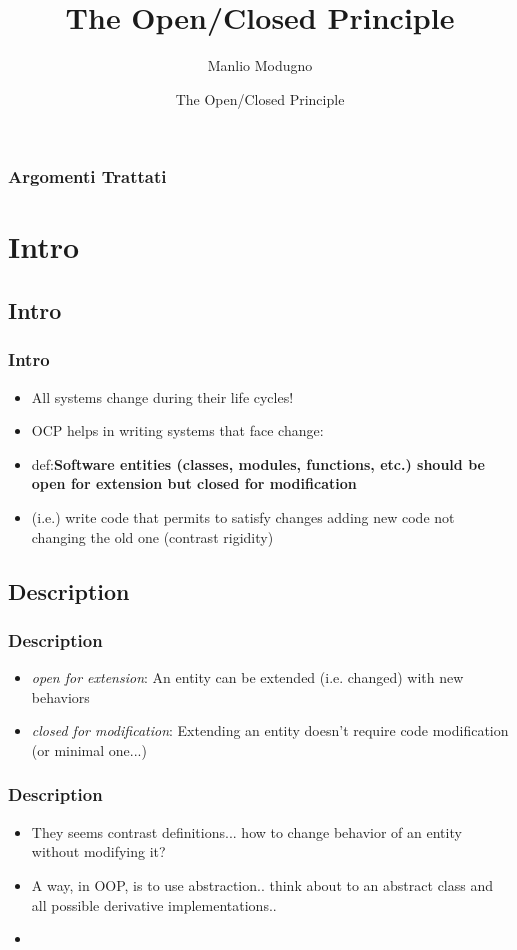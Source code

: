 \documentclass{beamer}
\title{The Open/Closed Principle}
\author{Manlio Modugno}
\institute[GMTechnologies]
\date[]{The Open/Closed Principle}
\begin{document}
\begin{frame}
  \titlepage
\end{frame}

\begin{frame}
  \frametitle{Argomenti Trattati}
  \tableofcontents
\end{frame}


\section{Intro}
\subsection{Intro}
\begin{frame}
  \frametitle{Intro}
  \begin{itemize}
	\item<+-> All systems change during their life cycles!
	\item<+-> OCP helps in writing systems that face change:
	\item<+-> def:\textbf{Software entities (classes, modules, functions, etc.) should be open for extension but closed for modification}
	\item<+-> (i.e.) write code that permits to satisfy changes adding new code not changing the old one (contrast rigidity) 
   \end{itemize}
\end{frame}

\subsection{Description}
\begin{frame}
  \frametitle{Description}
  \begin{itemize}
	\item<+-> \textit{open for extension}: An entity can be extended (i.e. changed) with new behaviors
	\item<+-> \textit{closed for modification}: Extending an entity doesn't require code modification (or minimal one...)
   \end{itemize}
\end{frame}

\begin{frame}
  \frametitle{Description}
  \begin{itemize}
	\item<+-> They seems contrast definitions... how to change behavior of an entity without modifying it? 
	\item<+-> A way, in OOP, is to use abstraction.. think about to an abstract class and all possible derivative implementations..
	\item<+-> 
   \end{itemize}
\end{frame}
\end{document}
